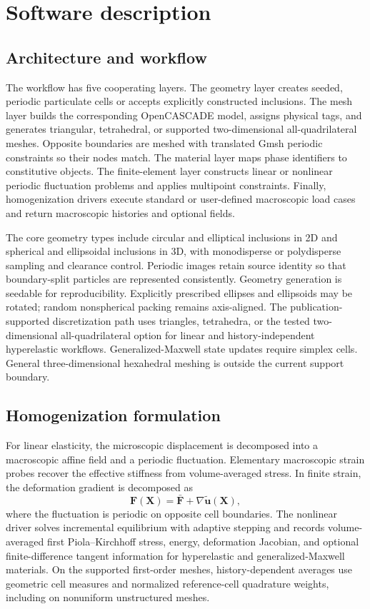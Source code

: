 \documentclass[preprint,12pt]{elsarticle}
\begin{document}
\section{Software description}

\subsection{Architecture and workflow}

The workflow has five cooperating layers. The geometry layer creates seeded,
periodic particulate cells or accepts explicitly constructed inclusions. The
mesh layer builds the corresponding OpenCASCADE model, assigns physical tags,
and generates triangular, tetrahedral, or supported two-dimensional
all-quadrilateral meshes. Opposite boundaries are meshed
with translated Gmsh periodic constraints so their nodes match. The material
layer maps phase identifiers to constitutive objects. The finite-element layer
constructs linear or nonlinear periodic fluctuation problems and applies
multipoint constraints. Finally, homogenization drivers execute standard or
user-defined macroscopic load cases and return macroscopic histories and
optional fields.

The core geometry types include circular and elliptical inclusions in 2D and
spherical and ellipsoidal inclusions in 3D, with monodisperse or polydisperse
sampling and clearance control. Periodic images retain source identity so that
boundary-split particles are represented consistently. Geometry generation is
seedable for reproducibility. Explicitly prescribed ellipses and ellipsoids may
be rotated; random nonspherical packing remains axis-aligned. The
publication-supported discretization path uses triangles, tetrahedra, or the
tested two-dimensional all-quadrilateral option for linear and
history-independent hyperelastic workflows. Generalized-Maxwell state updates
require simplex cells. General three-dimensional hexahedral meshing is outside
the current support boundary.

\subsection{Homogenization formulation}

For linear elasticity, the microscopic displacement is decomposed into a
macroscopic affine field and a periodic fluctuation. Elementary macroscopic
strain probes recover the effective stiffness from volume-averaged stress. In
finite strain, the deformation gradient is decomposed as
\begin{equation}
  \mathbf{F}(\mathbf{X}) = \bar{\mathbf{F}} +
  \nabla\widetilde{\mathbf{u}}(\mathbf{X}),
\end{equation}
where the fluctuation is periodic on opposite cell boundaries. The nonlinear
driver solves incremental equilibrium with adaptive stepping and records
volume-averaged first Piola--Kirchhoff stress, energy, deformation Jacobian,
and optional finite-difference tangent information for hyperelastic and
generalized-Maxwell materials. On the supported first-order meshes,
history-dependent averages use geometric cell measures and normalized
reference-cell quadrature weights, including on nonuniform unstructured
meshes.
\end{document}
